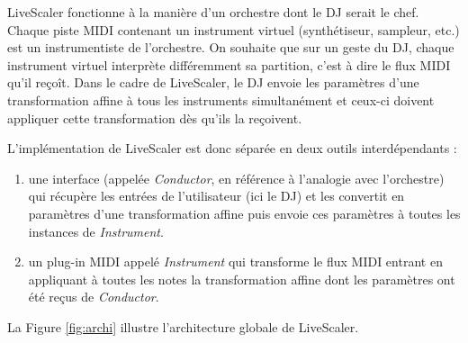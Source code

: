 \documentclass{article}
\begin{document}
LiveScaler fonctionne à la manière d'un orchestre dont le  DJ serait le chef. Chaque piste MIDI contenant un instrument virtuel (synthétiseur, sampleur, etc.) est un instrumentiste de l'orchestre. On souhaite que sur un geste du DJ, chaque instrument virtuel interprète différemment sa partition, c'est à dire le flux MIDI qu'il reçoît. Dans le cadre de LiveScaler, le DJ envoie les paramètres d'une transformation affine à tous les instruments simultanément et ceux-ci doivent appliquer cette transformation dès qu'ils la reçoivent.

L'implémentation de LiveScaler est donc séparée en deux outils interdépendants :
\begin{enumerate}
  \item une interface (appelée \emph{Conductor}, en référence à l'analogie avec l'orchestre) qui récupère les entrées de l'utilisateur (ici le DJ) et les convertit en paramètres d'une transformation affine puis envoie ces paramètres à toutes les instances de \emph{Instrument}.
  \item un plug-in MIDI appelé \emph{Instrument} qui transforme le flux MIDI entrant en appliquant à toutes les notes la transformation affine dont les paramètres ont été reçus de \emph{Conductor}.
\end{enumerate}
La Figure \ref{fig:archi} illustre l'architecture globale de LiveScaler.
\end{document}
